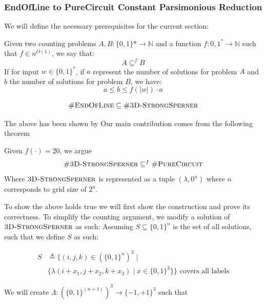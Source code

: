 \subsubsection{EndOfLine to PureCircuit Constant Parsimonious Reduction}

We will define the necessary prerequisites for the current section:

\begin{definition}
    Given two counting problems $A, B : \{0,1\}* \to \mathbb{N}$
    and a function $f : {0,1}^{*} \to \mathbb{N}$ such that $f \in n^{O(1)}$, we
    say that:
    $$
    A \subseteq^f B
    $$
    If for input $w \in \{0,1\}^*$, if $a$ represent the number of solutions
    for problem $A$ and $b$ the number of solutions for problem $B$, we have:
    $$
    a \leq b \leq f(|w|) \cdot a
    $$
\end{definition}

\begin{proposition}
    $$
    \textnormal{\textsc{\#EndOfLine}} \subseteq \textnormal{\textsc{\#3D-StrongSperner}}
    $$
\end{proposition}

The above has been shown by %
Our main contribution comes from the following theorem


\begin{theorem}
    Given $f(\cdot) = 20$, we argue
    $$
    \textnormal{\textsc{\#3D-StrongSperner}} \subseteq^f \textnormal{\textsc{\#PureCircuit}}
    $$
    Where $\textnormal{\textsc{3D-StrongSperner}}$ is represented as a tuple $(\lambda, 0^n)$
    where $n$ corresponds to grid size of $2^n$.
\end{theorem}

To show the above holds true we will first show the construction and
prove its correctness.
To simplify the counting argument, we modify a solution of $\textsc{3D-StrongSperner}$
as such: Assuming $S \subseteq \{0,1\}^n$ is the set of all solutions, such that we define $S$ as such:

\begin{align*}
    S &\triangleq \Big\{(i,j,k) \in (\{0,1\}^{n})^3 \mid  \\
      &\{\lambda(i + x_1, j + x_2, k + x_3) \mid x \in \{0,1\}^3 \}\Big\} \text{ covers all labels}
\end{align*}

We will create $\Lambda: (\{0,1\}^{(n+1)})^3 \to \{-1, +1\}^3$ such that
 
